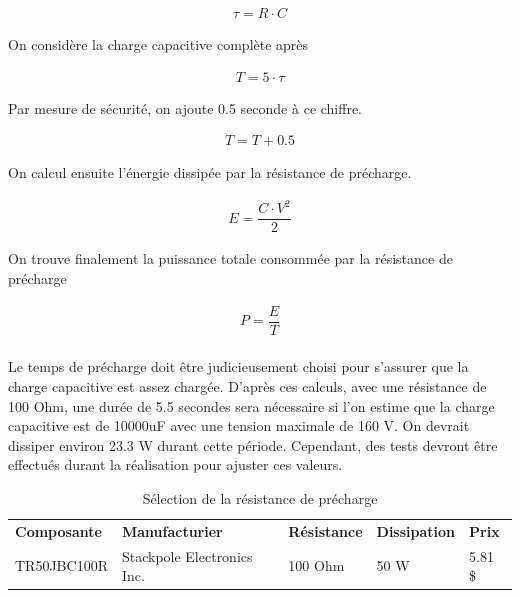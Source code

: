 		\begin{align}
			\tau =R \cdot C
			\label{eq:Constante de temps}
		\end{align}

		On considère la charge capacitive complète après

		\begin{align}
			T = 5 \cdot \tau
			\label{eq:CapaciteCharge}
		\end{align}

		Par mesure de sécurité, on ajoute 0.5 seconde à ce chiffre.

		\begin{align}
			T = T + 0.5
			\label{eq:Tempsdecharge}
		\end{align}

		On calcul ensuite l'énergie dissipée par la résistance de précharge.

		\begin{align}
			E = \dfrac{C \cdot V^2}{2}
			\label{eq:EnergiePrecharge}
		\end{align}

		On trouve finalement la puissance totale consommée par la résistance de précharge

		\begin{align}
			P = \dfrac{E}{T}
			\label{eq:PuissancePrecharge}
		\end{align}

		\paragraph*{}
		Le temps de précharge doit être judicieusement choisi pour s'assurer que la charge capacitive est assez chargée. D'après ces calculs, avec une résistance de 100 Ohm, une durée de 5.5 secondes sera nécessaire si l'on estime que la charge capacitive est de 10000uF avec une tension maximale de 160 V. On devrait dissiper environ 23.3 W durant cette période. Cependant, des tests devront être effectués durant la réalisation pour ajuster ces valeurs.

		\begin{table}[H]
			\centering
			\caption{Sélection de la résistance de précharge}
			\label{ResistancePrecharge}
			\renewcommand{\arraystretch}{1.3}
			\begin{tabular}{|p{3cm}|p{5cm}|p{2cm}|p{2cm}|p{1.5cm}|}
				\hline
				\textbf{Composante} & \textbf{Manufacturier} & \textbf{Résistance} & \textbf{Dissipation} & \textbf{Prix}
				\\ \hhline{|=|=|=|=|=|}
				TR50JBC100R & Stackpole Electronics Inc. & 100 Ohm & 50 W & 5.81 \$ \\ \hline
			\end{tabular}
		\end{table}

